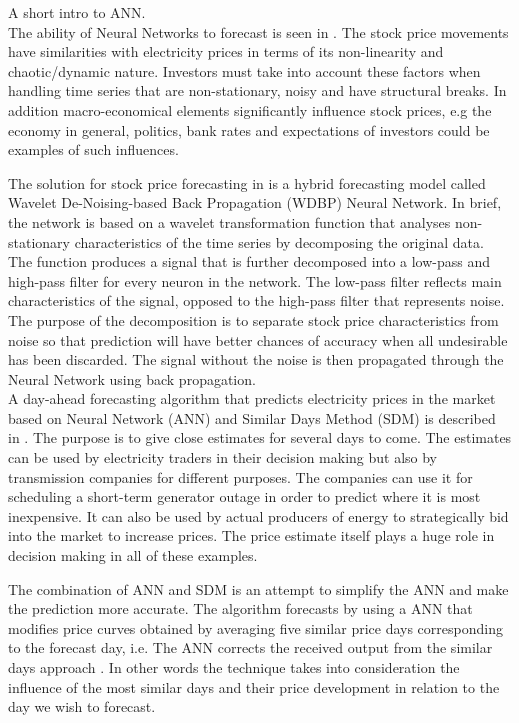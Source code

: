 A short intro to ANN.
\\[0.5cm]
The ability of Neural Networks to forecast is seen in \cite{stockForecasting}. The stock price movements have similarities with electricity prices in terms of its non-linearity and chaotic/dynamic nature. Investors must take into account these factors when handling time series that are non-stationary, noisy and have structural breaks. In addition macro-economical elements significantly influence stock prices, e.g the economy in general, politics, bank rates and expectations of investors could be examples of such influences.

The solution for stock price forecasting in \cite{stockForecasting} is a hybrid forecasting model called Wavelet De-Noising-based Back Propagation (WDBP) Neural Network. In brief, the network is based on a wavelet transformation function that analyses non-stationary characteristics of the time series by decomposing the original data. The function produces a signal that is further decomposed into a low-pass and high-pass filter for every neuron in the network. The low-pass filter reflects main characteristics of the signal, opposed to the high-pass filter that represents noise. The purpose of the decomposition is to separate stock price characteristics from noise so that prediction will have better chances of accuracy when all undesirable has been discarded. The signal without the noise is then propagated through the Neural Network using back propagation.
\\[0.5cm]
A day-ahead forecasting algorithm that predicts electricity prices in the market based on Neural Network (ANN) and Similar Days Method (SDM) is described in \cite{pjmForecast}. The purpose is to give close estimates for several days to come. The estimates can be used by electricity traders in their decision making but also by transmission companies for different purposes. The companies can use it for scheduling a short-term generator outage in order to predict where it is most inexpensive. It can also be used by actual producers of energy to strategically bid into the market to increase prices. The price estimate itself plays a huge role in decision making in all of these examples.

The combination of ANN and SDM is an attempt to simplify the ANN and make the prediction more accurate. The algorithm forecasts by using a ANN that modifies price curves obtained by averaging five similar price days corresponding to the forecast day, i.e. The ANN corrects the received output from the similar days approach \cite{pjmForecast}. In other words the technique takes into consideration the influence of the most similar days and their price development in relation to the day we wish to forecast.

